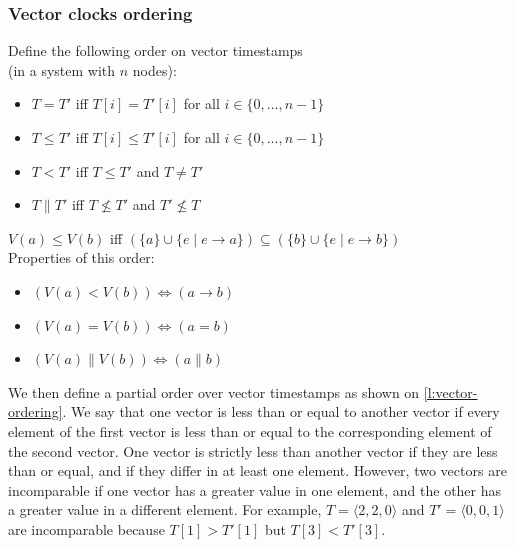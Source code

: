 \begin{frame}[label=vector-ordering]
    \label{s:vector-ordering}
    \frametitle{Vector clocks ordering}
    Define the following order on vector timestamps\\(in a system with $n$ nodes):
    \begin{itemize}
        \item $T = T'$ iff $T[i] = T'[i]$ for all $i \in \{0, \dots, n-1\}$
        \item $T \le T'$ iff $T[i] \le T'[i]$ for all $i \in \{0, \dots, n-1\}$
        \item $T < T'$ iff $T \le T'$ and $T \ne T'$
        \item $T \parallel T'$ iff $T \not\le T'$ and $T' \not\le T$\\[1em]
    \end{itemize}\pause
    $V(a) \le V(b)$ iff $(\{a\} \cup \{e \mid e \rightarrow a\}) \subseteq (\{b\} \cup \{e \mid e \rightarrow b\})$\\[1em]\pause
    Properties of this order:
    \begin{itemize}
        \item $(V(a) < V(b)) \Longleftrightarrow (a \rightarrow b)$
        \item $(V(a) = V(b)) \Longleftrightarrow (a = b)$
        \item $(V(a) \parallel V(b)) \Longleftrightarrow (a \parallel b)$
    \end{itemize}
\end{frame}
\label{l:vector-ordering}

We then define a partial order over vector timestamps as shown on \autoref{l:vector-ordering}.
We say that one vector is less than or equal to another vector if every element of the first vector is less than or equal to the corresponding element of the second vector.
One vector is strictly less than another vector if they are less than or equal, and if they differ in at least one element.
However, two vectors are incomparable if one vector has a greater value in one element, and the other has a greater value in a different element.
For example, $T = \langle 2, 2, 0\rangle$ and $T' = \langle 0, 0, 1\rangle$ are incomparable because $T[1] > T'[1]$ but $T[3] < T'[3]$.


